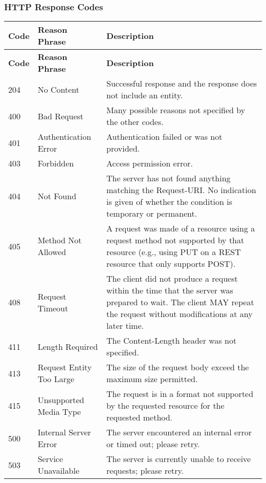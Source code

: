 
\subsubsection{HTTP Response Codes}

\begin{comment}
List expected response codes (indicate any variation that exists across
different versions):
\end{comment}


\begin{longtable}{|>{\raggedright}p{}|>{\raggedright}p{}|>{\raggedright}p{}|}
\hline
\hline 
\textbf{\footnotesize{Code}} & \textbf{\footnotesize{Reason Phrase}} & \textbf{\footnotesize{Description}}\tabularnewline
\hline
\endfirsthead
\hline
\hline 
\textbf{\footnotesize{Code}} & \textbf{\footnotesize{Reason Phrase}} & \textbf{\footnotesize{Description}}\tabularnewline
\hline
\endhead
\hline 
{\footnotesize{204}} & {\footnotesize{No Content}} & {\footnotesize{Successful response and the response does not include
an entity.}}\tabularnewline
\hline 
{\footnotesize{400}} & {\footnotesize{Bad Request}} & {\footnotesize{Many possible reasons not specified by the other codes.}}\tabularnewline
\hline 
{\footnotesize{401}} & {\footnotesize{Authentication Error}} & {\footnotesize{Authentication failed or was not provided.}}\tabularnewline
\hline 
{\footnotesize{403}} & {\footnotesize{Forbidden}} & {\footnotesize{Access permission error.}}\tabularnewline
\hline 
{\footnotesize{404}} & {\footnotesize{Not Found}} & {\footnotesize{The server has not found anything matching the Request-URI.
No indication is given of whether the condition is temporary or permanent.}}\tabularnewline
\hline 
{\footnotesize{405}} & {\footnotesize{Method Not Allowed}} & {\footnotesize{A request was made of a resource using a request method
not supported by that resource (e.g., using PUT on a REST resource
that only supports POST).}}\tabularnewline
\hline 
{\footnotesize{408}} & {\footnotesize{Request Timeout}} & {\footnotesize{The client did not produce a request within the time
that the server was prepared to wait. The client MAY repeat the request
without modifications at any later time. }}\tabularnewline
\hline 
{\footnotesize{411}} & {\footnotesize{Length Required}} & {\footnotesize{The Content-Length header was not specified.}}\tabularnewline
\hline 
{\footnotesize{413}} & {\footnotesize{Request Entity Too Large}} & {\footnotesize{The size of the request body exceed the maximum size
permitted.}}\tabularnewline
\hline 
{\footnotesize{415}} & {\footnotesize{Unsupported Media Type}} & {\footnotesize{The request is in a format not supported by the requested
resource for the requested method.}}\tabularnewline
\hline 
{\footnotesize{500}} & {\footnotesize{Internal Server Error}} & {\footnotesize{The server encountered an internal error or timed out;
please retry.}}\tabularnewline
\hline 
{\footnotesize{503}} & {\footnotesize{Service Unavailable}} & {\footnotesize{The server is currently unable to receive requests;
please retry.}}\tabularnewline
\hline 
\end{longtable}




